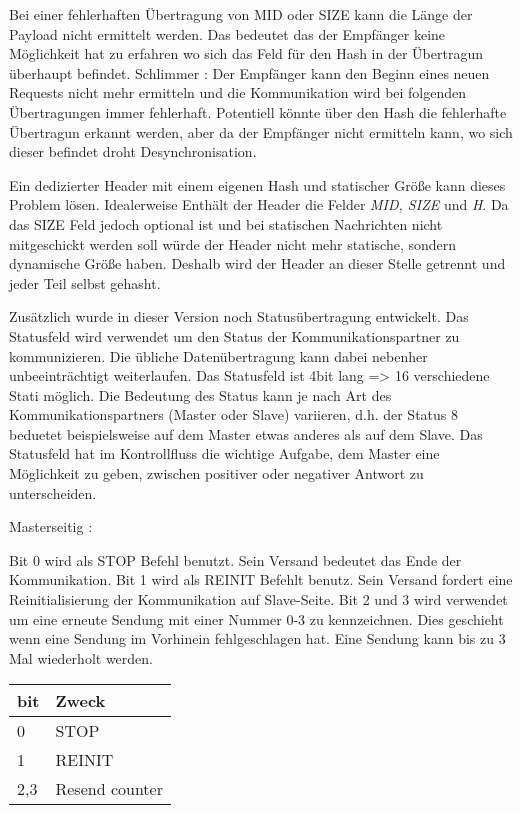 \begin{itemize}
\begin{center}
\begin{center}
Bei einer fehlerhaften Übertragung von MID oder SIZE kann die Länge der Payload nicht ermittelt werden. Das bedeutet das der Empfänger keine Möglichkeit hat zu erfahren wo sich das Feld für den Hash in der Übertragun überhaupt befindet. Schlimmer : Der Empfänger kann den Beginn eines neuen Requests nicht mehr ermitteln und die Kommunikation wird bei folgenden Übertragungen immer fehlerhaft. Potentiell könnte über den Hash die fehlerhafte Übertragun erkannt werden, aber da der Empfänger nicht ermitteln kann, wo sich dieser befindet droht Desynchronisation.

Ein dedizierter Header mit einem eigenen Hash und statischer Größe kann dieses Problem lösen. Idealerweise Enthält der Header die Felder \textit{MID, SIZE} und \textit{H}. Da das SIZE Feld jedoch optional ist und bei statischen Nachrichten nicht mitgeschickt werden soll würde der Header nicht mehr statische, sondern dynamische Größe haben. Deshalb wird der Header an dieser Stelle getrennt und jeder Teil selbst gehasht.


Zusätzlich wurde in dieser Version noch Statusübertragung entwickelt.
Das Statusfeld wird verwendet um den Status der Kommunikationspartner zu kommunizieren.
Die übliche Datenübertragung kann dabei nebenher unbeeinträchtigt weiterlaufen.
Das Statusfeld ist 4bit lang => 16 verschiedene Stati möglich.
Die Bedeutung des Status kann je nach Art des Kommunikationspartners (Master oder Slave) variieren, d.h. der Status 8 beduetet beispielsweise auf dem Master etwas anderes als auf dem Slave.
Das Statusfeld hat im Kontrollfluss die wichtige Aufgabe, dem Master eine Möglichkeit zu geben, zwischen positiver oder negativer Antwort zu unterscheiden.

Masterseitig : 

Bit 0 wird als STOP Befehl benutzt. Sein Versand bedeutet das Ende der Kommunikation.
Bit 1 wird als REINIT Befehlt benutz. Sein Versand fordert eine Reinitialisierung der Kommunikation auf Slave-Seite.
Bit 2 und 3 wird verwendet um eine erneute Sendung mit einer Nummer 0-3 zu kennzeichnen. Dies geschieht wenn eine Sendung im Vorhinein fehlgeschlagen hat. Eine Sendung kann bis zu 3 Mal wiederholt werden.

\begin{tabular}{l | l}
	bit & Zweck \\
	\hline \hline
	0 & STOP \\
	1 & REINIT \\
	2,3 & Resend counter
\end{tabular}


\end{center}
\end{center}
\end{itemize}
